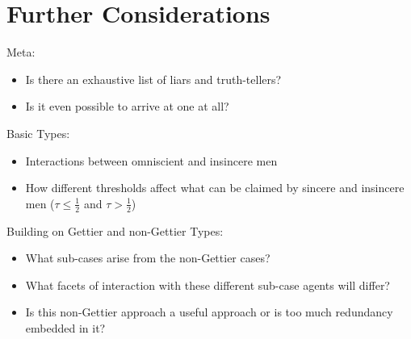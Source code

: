 \documentclass[12pt, titlepage, twoside, a4paper]{report}
\begin{document}
\chapter{Further Considerations}
Meta:
\begin{itemize}
\item Is there an exhaustive list of liars and truth-tellers?
\item Is it even possible to arrive at one at all?
\end{itemize}
Basic Types:
\begin{itemize}
\item Interactions between omniscient and insincere men
\item How different thresholds affect what can be claimed by sincere and insincere men ($\tau \leq \frac{1}{2}$ and $\tau > \frac{1}{2}$)
\end{itemize}
Building on Gettier and non-Gettier Types:
\begin{itemize}
\item What sub-cases arise from the non-Gettier cases?\item What facets of interaction with these different sub-case agents will differ?
\item Is this non-Gettier approach a useful approach or is too much redundancy embedded in it?
\end{itemize}

\printbibliography
\end{document}
